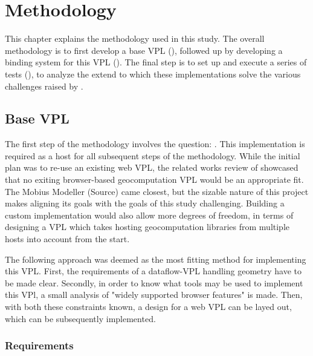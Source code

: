 \chapter{Methodology}
\label{chap:methodology}

This chapter explains the methodology used in this study. 
The overall methodology is to first develop a base VPL (), followed up by developing a binding system for this VPL (). 
The final step is to set up and execute a series of tests (), to analyze the extend to which these implementations solve the various challenges raised by .

\section{Base VPL} 
\label{sec:method-base-vpl}

The first step of the methodology involves the question: \mySubRQOne.
This implementation is required as a host for all subsequent steps of the methodology. 
While the initial plan was to re-use an existing web VPL, the related works review of  showcased that no exiting browser-based geocomputation VPL would be an appropriate fit.
The Mobius Modeller (Source) came closest, but the sizable nature of this project makes aligning its goals with the goals of this study challenging. 
Building a custom implementation would also allow more degrees of freedom, in terms of designing a VPL which takes hosting geocomputation libraries from multiple hosts  into account from the start. 

The following approach was deemed as the most fitting method for implementing this VPL. 
First, the requirements of a dataflow-VPL handling geometry have to be made clear.
Secondly, in order to know what tools may be used to implement this VPl, a small analysis of "widely supported browser features" is made. 
Then, with both these constraints known, a design for a web VPL can be layed out, which can be subsequently implemented. 

\newpage
\subsection{Requirements}

